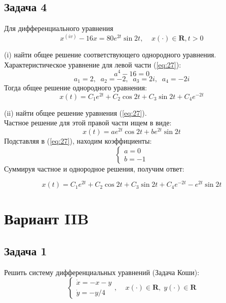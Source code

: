 \documentclass[a4paper, 12pt]{article}
\begin{document}
	\subsection {Задача 4}

Для дифференциального уравнения
\begin{equation}
x^{(iv)}-16x=80e^{2t}\sin{2t}, \;\;\;\; x(\cdot)\in \textbf{R}, t> 0
\label{eq:27}
\end{equation}

(i) найти общее решение соответствующего однородного уравнения.\\
Характеристическое уравнение для левой части (\ref{eq:27}):
\[a^4-16=0\]
\[a_1 = 2,\;\;a_2 =-2,\;\;a_3=2i,\;\;a_4=-2i\]
Тогда общее решение однородного уравнения:
\begin{equation}
x(t) = C_1e^{2t}+C_2\cos{2t}+C_3\sin{2t}+C_4e^{-2t}
\label{eq:28}
\end{equation}

(ii) найти общее решение уравнения (\ref{eq:27}).\\
Частное решение для этой правой части ищем в виде:
\[ x(t) = ae^{2t}\cos{2t}+be^{2t}\sin{2t}\]
Подставляя в (\ref{eq:27}), находим коэффициенты: 
\[
\left\{
\begin{array}{lr}
a =0\\
b = -1
\end{array}
\right.
\]
Суммируя частное и однородное решения, получим ответ:

\[x(t) = C_1e^{2t}+C_2\cos{2t}+C_3\sin{2t}+C_4e^{-2t}-e^{2t}\sin{2t} \]

















	\section{Вариант IIB}
		\subsection {Задача 1}


 Решить систему дифференциальных уравнений (Задача Коши): 
\begin{equation}
\left\{
\begin{array}{lr}
\dot{x} = -x-y\\
\dot{y} = -y/4
\end{array}
\right.
, \;\;\;\; x(\cdot)\in \textbf{R},\; y(\cdot)\in \textbf{R}
\label{eq:29}
\end{equation}
\end{document}
